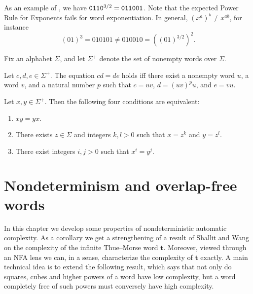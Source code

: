 		As an example of , we have $\mathtt{0110}^{3/2}=\mathtt{011001}$.
		Note that the expected Power Rule for Exponents fails for word exponentiation.
		In general, $(x^a)^b\ne x^{ab}$, for instance
		\[
			(01)^3=010101\ne 010010= ((01)^{3/2})^2.
		\]

		Fix an alphabet $\Sigma$, and let $\Sigma^+$ denote the set of nonempty words over $\Sigma$.

		\begin{lemma}\label{shallit232}\label{thm:lyndon}
			Let $c,d,e\in\Sigma^+$.
			The equation $cd=de$ holds iff there exist a nonempty word $u$,
			a word $v$, and a natural number $p$ such that
			$c=uv$,
			$d=(uv)^p u$, and
			$e=vu$.
		\end{lemma}

		\begin{theorem}\label{thm:shallit233}\label{lyndon:schuetzenberger}
			Let $x,y\in\Sigma^+$. Then the following four conditions are equivalent:
			\begin{enumerate}
				\item\label{t:1} $xy=yx$.
				\item\label{t:2} There exists $z\in\Sigma$ and integers $k,l>0$ such that $x=z^k$ and $y=z^l$.
				\item\label{t:3} There exist integers $i,j>0$ such that $x^i=y^j$.
			\end{enumerate}
		\end{theorem}


\chapter{Nondeterminism and overlap-free words}\label{chap:EJC}

	
	In this chapter we develop some properties of nondeterministic automatic complexity.
	As a corollary we get a strengthening of a result of Shallit and Wang~\cite{MR1897300}
	on the complexity of the infinite Thue--Morse word $\mathbf t$.
	Moreover, viewed through an NFA lens we can, in a sense, characterize the complexity of $\mathbf t$ exactly.
	A main technical idea is to extend the following result, which says that not only do squares, cubes and higher powers of a word have low complexity,
	but a word completely free of such powers must conversely have high complexity.

